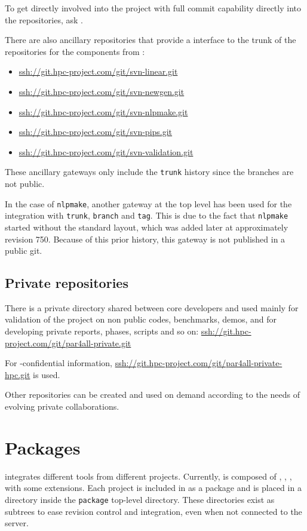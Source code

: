 \documentclass[a4paper]{article}
\begin{document}
To get directly involved into the project with full commit capability
directly into the repositories, ask \Ahpcp.

There are also ancillary \Agit repositories that provide a \Agit interface to
the trunk of the \Asvn repositories for the \Apips components from
\Acri:
\begin{itemize}
\item \url{ssh://git.hpc-project.com/git/svn-linear.git}
\item \url{ssh://git.hpc-project.com/git/svn-newgen.git}
\item \url{ssh://git.hpc-project.com/git/svn-nlpmake.git}
\item \url{ssh://git.hpc-project.com/git/svn-pips.git}
\item \url{ssh://git.hpc-project.com/git/svn-validation.git}
\end{itemize}
These ancillary gateways only include the \texttt{trunk} history since the
\Acri branches are not public.

In the case of \texttt{nlpmake}, another \Agit{} \Asvn gateway at the top
level has been used for the integration with \texttt{trunk},
\texttt{branch} and \texttt{tag}. This is due to the fact that
\texttt{nlpmake} started without the standard
layout, which was added later at approximately revision 750. Because
of this prior history, this gateway is not published in a public git.

\subsection{Private repositories}
\label{sec:private-repositories}

There is a private directory shared between core developers and used mainly
for validation of the project on non public codes, benchmarks, demos,
and for developing private reports, phases, scripts and so on:
\url{ssh://git.hpc-project.com/git/par4all-private.git}

For \Ahpcp-confidential information,
\url{ssh://git.hpc-project.com/git/par4all-private-hpc.git} is used.

Other repositories can be created and used on demand according to the
needs of evolving private collaborations.

\section{Packages}
\label{sec:packages}

\Apfa integrates different tools from different projects. Currently, \Apfa
is composed of \Apips, \Apipsgfc, \Apolylib, with some extensions. Each
project is included in \Apfa as a package and is placed in a directory
inside the \texttt{package} top-level directory.
These directories exist as \Agit subtrees to ease revision control and
integration, even when not connected to the \Asvn server.
\end{document}
